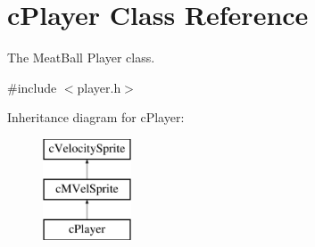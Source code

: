 \hypertarget{classc_player}{\section{c\-Player Class Reference}
\label{classc_player}
}


The Meat\-Ball Player class.  




{\ttfamily \#include $<$player.\-h$>$}

Inheritance diagram for c\-Player\-:\begin{figure}[H]
\begin{center}
\leavevmode
\includegraphics[height=3.000000cm]{classc_player}
\end{center}
\end{figure}
